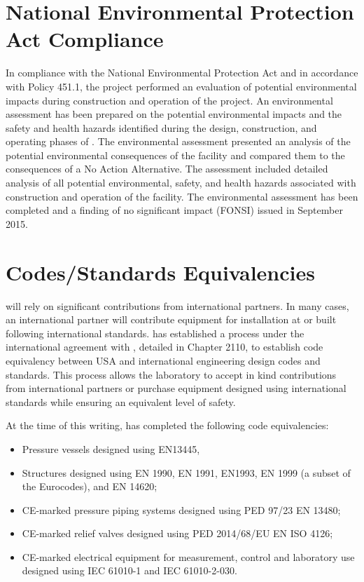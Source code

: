 \section{National Environmental Protection Act Compliance}

In compliance with the National Environmental Protection Act and in
accordance with  Policy 451.1, the
 project performed an evaluation of potential
environmental impacts during construction and operation of the
project.  An environmental assessment has been prepared on the
potential environmental impacts and the safety and health hazards
identified during the design, construction, and operating phases of
.  The environmental assessment presented an
analysis of the potential environmental consequences of the facility
and compared them to the consequences of a No Action Alternative. The
assessment included detailed analysis of all potential environmental,
safety, and health hazards associated with construction and operation
of the facility.  The environmental assessment has been completed and
a finding of no significant impact (FONSI) issued in September 2015.

\section{Codes/Standards Equivalencies}
\label{sec:esh_codes}

 will rely on significant contributions from international
partners. In many cases, an international partner will contribute
equipment for installation at  or  built
following international standards.  has established a
process under the international agreement with , detailed
in  Chapter 2110, to establish code equivalency between
USA and international engineering design codes and standards. This
process allows the laboratory to accept in kind contributions from
international partners or purchase equipment designed using
international standards while ensuring an equivalent level
of safety.

At the time of this writing, \fnal has completed the following code
equivalencies:
\begin{itemize}
 \item Pressure vessels designed using EN13445,
 \item Structures designed using EN 1990, EN 1991, EN1993, EN 1999 (a
   subset of the Eurocodes), and EN 14620;
 \item CE-marked pressure piping systems designed using PED 97/23 EN 13480;
 \item CE-marked relief valves designed using PED 2014/68/EU EN ISO 4126;
 \item CE-marked electrical equipment for measurement, control and
   laboratory use designed using IEC 61010-1 and IEC 61010-2-030.
\end{itemize}

